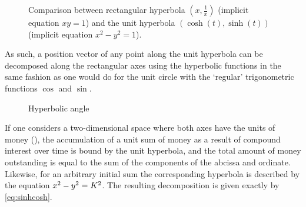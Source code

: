 \begin{figure}
    \centering
    \caption{Comparison between rectangular hyperbola $(x, \tfrac{1}{x})$ (implicit equation $xy= 1$) and the unit hyperbola $(\cosh(t), \sinh(t))$ (implicit equation $x^2 - y^2 = 1$).}
\end{figure}

As such, a position vector of any point along the unit hyperbola can be decomposed along the rectangular axes using the hyperbolic functions in the same fashion as one would do for the unit circle with the `regular' trigonometric functions $\cos$ and $\sin$.

\begin{figure}
    \centering
    \caption{Hyperbolic angle}
\end{figure}

If one considers a two-dimensional space where both axes have the units of money (\si{\money}), the accumulation of a unit sum of money as a result of compound interest over time is bound by the unit hyperbola, and the total amount of money outstanding is equal to the sum of the components of the abcissa and ordinate. Likewise, for an arbitrary initial sum \ininv the corresponding hyperbola is described by the equation $x^2 - y^2 = K^2$. The resulting decomposition is given exactly by \cref{eq:sinhcosh}.

